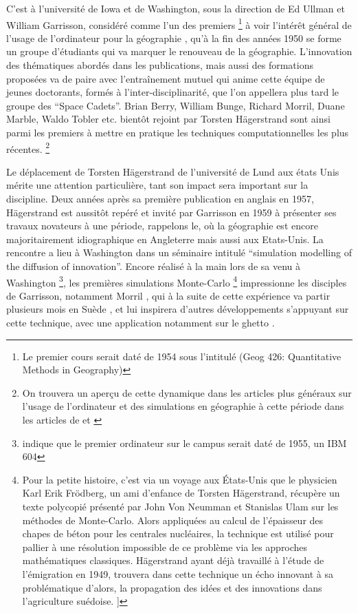 C'est à l'université de Iowa et de Washington, sous la direction de Ed Ullman et William Garrisson, considéré comme l'un des premiers \footnote {Le premier cours serait daté de 1954 sous l'intitulé (Geog 426: Quantitative Methods in Geography) } à voir l'intérêt général de l'usage de l'ordinateur pour la géographie , qu'à la fin des années 1950 se forme un groupe d'étudiants qui va marquer le renouveau de la géographie. L'innovation des thématiques abordés dans les publications, mais aussi des formations proposées va de paire avec l’entraînement mutuel qui anime cette équipe de jeunes doctorants, formés à l'inter-disciplinarité, que l'on appellera plus tard le groupe des \foreignquote{english}{Space Cadets}. Brian Berry, William Bunge, Richard Morril, Duane Marble, Waldo Tobler etc. bientôt rejoint par Torsten Hägerstrand sont ainsi parmi les premiers à mettre en pratique les techniques computationnelles les plus récentes. \footnote{ On trouvera un aperçu de cette dynamique dans les articles plus généraux sur l'usage de l'ordinateur et des simulations en géographie à cette période dans les articles de \textcite{Haggett1969} et \textcite{Marble1972}}

Le déplacement de Torsten Hägerstrand de l'université de Lund aux états Unis mérite une attention particulière, tant son impact sera important sur la discipline. Deux années après sa première publication en anglais en 1957, Hägerstrand est aussitôt repéré et invité par Garrisson en 1959 à présenter ses travaux novateurs à une période, rappelons le, où la géographie est encore majoritairement idiographique en Angleterre mais aussi aux Etats-Unis. La rencontre a lieu à Washington dans un séminaire intitulé \foreignquote{english}{simulation modelling of the diffusion of innovation}. Encore réalisé à la main lors de sa venu à Washington \footnote{ \textcite{Barnes2006a} indique que le premier ordinateur sur le campus serait daté de 1955, un IBM 604}, les premières simulations Monte-Carlo \footnote{Pour la petite histoire, c'est via un voyage aux États-Unis que le physicien Karl Erik Frödberg, un ami d'enfance de Torsten Hägerstrand, récupère un texte polycopié présenté par John Von Neumman et Stanislas Ulam sur les méthodes de Monte-Carlo. Alors appliquées au calcul de l'épaisseur des chapes de béton pour les centrales nucléaires, la technique est utilisé pour pallier à une résolution impossible de ce problème via les approches mathématiques classiques.  Hägerstrand ayant déjà travaillé à l'étude de l'émigration en 1949, trouvera dans cette technique un écho innovant à sa problématique d'alors, la propagation des idées et des innovations dans l'agriculture suédoise. \autocite[26-28]{Gould2004}]} impressionne les disciples de Garrisson, notamment Morril \autocite[120]{Unwin1992}, qui à la suite de cette expérience va partir plusieurs mois en Suède \autocite{Morril2005}, et lui inspirera d'autres développements s'appuyant sur cette technique, avec une application notamment sur le ghetto \textcite{Marble1972}.

